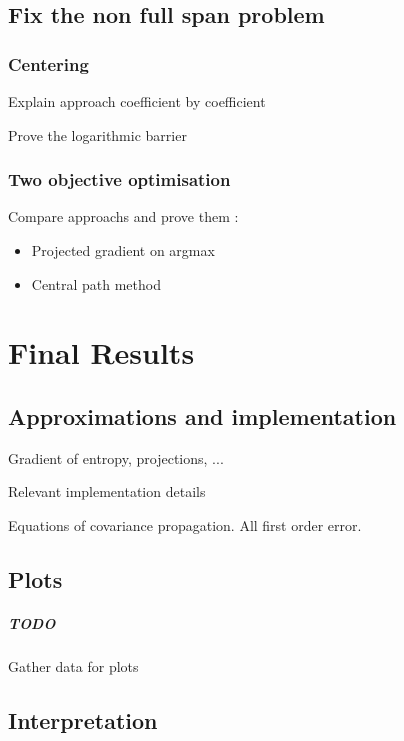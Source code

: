 \documentclass[10pt]{report}
\theoremstyle{plain}
\theoremstyle{definition}
\theoremstyle{remark}
\begin{document}
\section{Fix the non full span problem}\label{sec:fixspan}

\subsection{Centering}

Explain approach coefficient by coefficient

Prove the logarithmic barrier

\subsection{Two objective optimisation}

Compare approachs and prove them :
\begin{itemize}
  \item Projected gradient on argmax
  \item Central path method
\end{itemize}

\chapter{Final Results}

\section{Approximations and implementation}

Gradient of entropy, projections, ...

Relevant implementation details

Equations of covariance propagation. All first order error.

\section{Plots}

\paragraph{TODO} Gather data for plots

\section{Interpretation}
\end{document}
